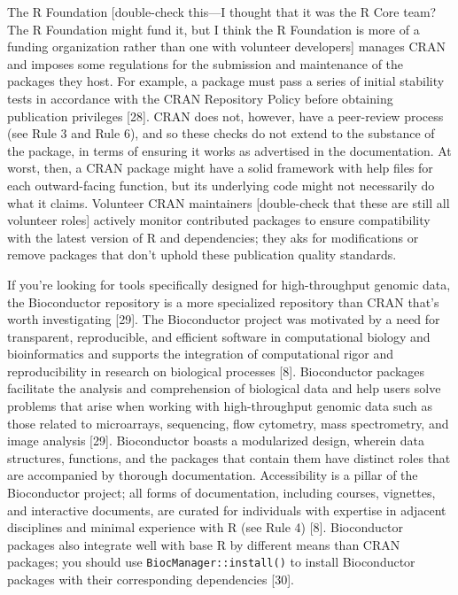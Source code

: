 \documentclass[10pt,letterpaper]{article}
\begin{document}
The R Foundation {[}double-check this---I thought that it was the R Core
team? The R Foundation might fund it, but I think the R Foundation is
more of a funding organization rather than one with volunteer
developers{]} manages CRAN and imposes some regulations for the
submission and maintenance of the packages they host. For example, a
package must pass a series of initial stability tests in accordance with
the CRAN Repository Policy before obtaining publication privileges
{[}28{]}. CRAN does not, however, have a peer-review process (see Rule 3
and Rule 6), and so these checks do not extend to the substance of the
package, in terms of ensuring it works as advertised in the
documentation. At worst, then, a CRAN package might have a solid
framework with help files for each outward-facing function, but its
underlying code might not necessarily do what it claims. Volunteer CRAN
maintainers {[}double-check that these are still all volunteer roles{]}
actively monitor contributed packages to ensure compatibility with the
latest version of R and dependencies; they aks for modifications or
remove packages that don't uphold these publication quality standards.

If you're looking for tools specifically designed for high-throughput
genomic data, the Bioconductor repository is a more specialized
repository than CRAN that's worth investigating {[}29{]}. The
Bioconductor project was motivated by a need for transparent,
reproducible, and efficient software in computational biology and
bioinformatics and supports the integration of computational rigor and
reproducibility in research on biological processes {[}8{]}.
Bioconductor packages facilitate the analysis and comprehension of
biological data and help users solve problems that arise when working
with high-throughput genomic data such as those related to microarrays,
sequencing, flow cytometry, mass spectrometry, and image analysis
{[}29{]}. Bioconductor boasts a modularized design, wherein data
structures, functions, and the packages that contain them have distinct
roles that are accompanied by thorough documentation. Accessibility is a
pillar of the Bioconductor project; all forms of documentation,
including courses, vignettes, and interactive documents, are curated for
individuals with expertise in adjacent disciplines and minimal
experience with R (see Rule 4) {[}8{]}. Bioconductor packages also
integrate well with base R by different means than CRAN packages; you
should use \texttt{BiocManager::install()} to install Bioconductor
packages with their corresponding dependencies {[}30{]}.
\end{document}
